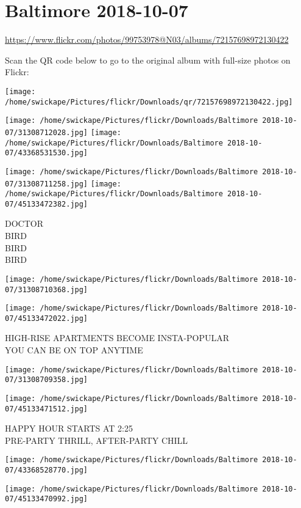 \documentclass[10pt,letterpaper]{article}
\title{}
\author{}
\date{}
\begin{document}
\section*{Baltimore 2018-10-07}

\url{https://www.flickr.com/photos/99753978@N03/albums/72157698972130422}

Scan the QR code below to go to the original album with full-size photos on Flickr:

\texttt{[image: /home/swickape/Pictures/flickr/Downloads/qr/72157698972130422.jpg]}
\pagebreak

\texttt{[image: /home/swickape/Pictures/flickr/Downloads/Baltimore 2018-10-07/31308712028.jpg]}
\texttt{[image: /home/swickape/Pictures/flickr/Downloads/Baltimore 2018-10-07/43368531530.jpg]}

\texttt{[image: /home/swickape/Pictures/flickr/Downloads/Baltimore 2018-10-07/31308711258.jpg]}
\texttt{[image: /home/swickape/Pictures/flickr/Downloads/Baltimore 2018-10-07/45133472382.jpg]}

DOCTOR\\
BIRD\\
BIRD\\
BIRD
\pagebreak

\texttt{[image: /home/swickape/Pictures/flickr/Downloads/Baltimore 2018-10-07/31308710368.jpg]}

\vspace{0.25in}
\texttt{[image: /home/swickape/Pictures/flickr/Downloads/Baltimore 2018-10-07/45133472022.jpg]}

HIGH{-}RISE APARTMENTS BECOME INSTA{-}POPULAR\\
YOU CAN BE ON TOP ANYTIME
\pagebreak

\texttt{[image: /home/swickape/Pictures/flickr/Downloads/Baltimore 2018-10-07/31308709358.jpg]}

\vspace{0.25in}
\texttt{[image: /home/swickape/Pictures/flickr/Downloads/Baltimore 2018-10-07/45133471512.jpg]}

HAPPY HOUR STARTS AT 2:25\\
PRE{-}PARTY THRILL, AFTER{-}PARTY CHILL
\pagebreak

\texttt{[image: /home/swickape/Pictures/flickr/Downloads/Baltimore 2018-10-07/43368528770.jpg]}

\vspace{0.25in}
\texttt{[image: /home/swickape/Pictures/flickr/Downloads/Baltimore 2018-10-07/45133470992.jpg]}
\end{document}
